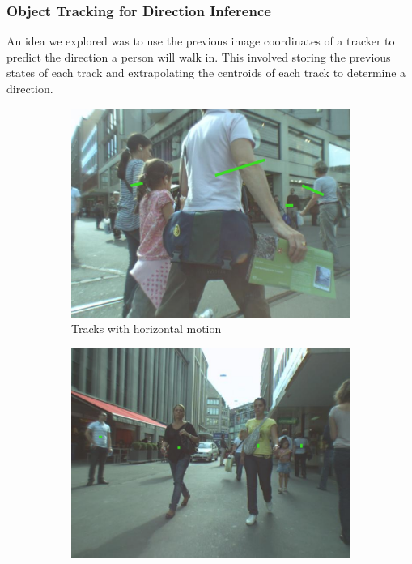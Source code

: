 \newpage
\subsubsection{Object Tracking for Direction Inference} \label{sec:objecTrackingDirection}
An idea we explored was to use the previous image coordinates of a tracker to predict the direction a person will walk in. This involved storing the previous states of each track and extrapolating the centroids of each track to determine a direction.

\begin{figure}[ht]
    \begin{subfigure}[b]{.45\textwidth}
        \centering
        \includegraphics[width=1.0\linewidth]{img/chapter4_analysis/linExDirection.png}
        \caption{Tracks with horizontal motion}
    \end{subfigure}%
    \hspace{\fill} 
    \begin{subfigure}[b]{.45\textwidth}
        \centering
        \includegraphics[width=1.0\linewidth]{img/chapter4_analysis/linExDirectionAmb.png}

\end{subfigure}
\end{figure}
